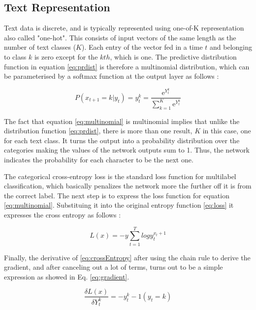 \subsection{Text Representation}
Text data is discrete, and is typically represented using one-of-K representation also called "one-hot". This consists of input vectors of the same length as the number of text classes ($K$). Each entry of the vector fed in a time $t$ and belonging to class $k$ is zero except for the $kth$, which is one. The predictive distribution function in equation \ref{eq:prdist} is therefore a multinomial distribution, which can be parameterised by a softmax function at the output layer as follows \cite{graves2013generating}:

\begin{equation} \label{eq:multinomial}
P(x_{t+1}=k|y_t)=y^k_t=\frac{\mathrm{e}^{Y^k_t}}{ \sum_{k=1}^{K} \mathrm{e}^{Y^k_t}}
\end{equation}

The fact that equation \ref{eq:multinomial} is multinomial implies that unlike the distribution function \ref{eq:prdist}, there is more than one result, $K$ in this case, one for each text class.  It turns the output into a probability distribution over the categories making the values of the network outputs sum to 1. Thus, the network indicates the probability for each character to be the next one.

The categorical cross-entropy loss is the standard loss function for multilabel classification, which basically penalizes the network more the further off it is from the correct label. The next step is to express the loss function for equation \ref{eq:multinomial}. Substituing it into the original entropy function \ref{eq:loss} it expresses the cross entropy as follows \cite{graves2013generating}:

\begin{equation} \label{eq:crossEntropy}
L(x)=-y \sum_{t=1}^{T} log y^{x_t+1}_t
\end{equation}

Finally, the derivative of \ref{eq:crossEntropy} after using the chain rule to derive the gradient, and after canceling out a lot of terms, turns out to be a simple expression as showed in Eq. \ref{eq:gradient}.

\begin{equation} \label{eq:cgradient}
\frac{\delta L(x)}{\delta Y^k_t}=- y^k_t - 1 (y_t=k)
\end{equation}

